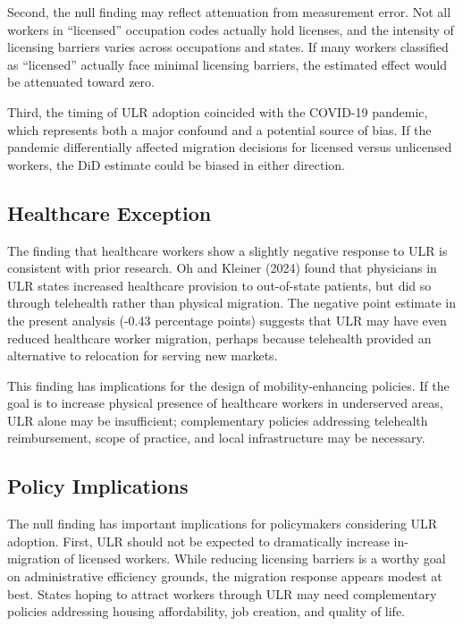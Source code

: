 \documentclass[12pt]{article}
\begin{document}
Second, the null finding may reflect attenuation from measurement error. Not all workers in ``licensed'' occupation codes actually hold licenses, and the intensity of licensing barriers varies across occupations and states. If many workers classified as ``licensed'' actually face minimal licensing barriers, the estimated effect would be attenuated toward zero.

Third, the timing of ULR adoption coincided with the COVID-19 pandemic, which represents both a major confound and a potential source of bias. If the pandemic differentially affected migration decisions for licensed versus unlicensed workers, the DiD estimate could be biased in either direction.

\subsection{Healthcare Exception}

The finding that healthcare workers show a slightly negative response to ULR is consistent with prior research. Oh and Kleiner (2024) found that physicians in ULR states increased healthcare provision to out-of-state patients, but did so through telehealth rather than physical migration. The negative point estimate in the present analysis (-0.43 percentage points) suggests that ULR may have even reduced healthcare worker migration, perhaps because telehealth provided an alternative to relocation for serving new markets.

This finding has implications for the design of mobility-enhancing policies. If the goal is to increase physical presence of healthcare workers in underserved areas, ULR alone may be insufficient; complementary policies addressing telehealth reimbursement, scope of practice, and local infrastructure may be necessary.

\subsection{Policy Implications}

The null finding has important implications for policymakers considering ULR adoption. First, ULR should not be expected to dramatically increase in-migration of licensed workers. While reducing licensing barriers is a worthy goal on administrative efficiency grounds, the migration response appears modest at best. States hoping to attract workers through ULR may need complementary policies addressing housing affordability, job creation, and quality of life.
\end{document}
